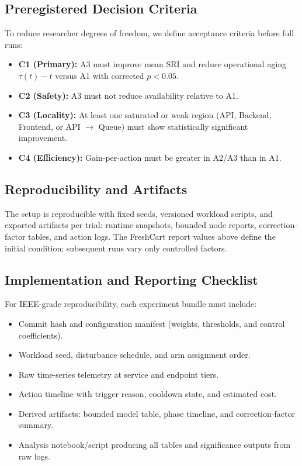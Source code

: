 \documentclass[conference]{IEEEtran}
\begin{document}
\subsection{Preregistered Decision Criteria}
To reduce researcher degrees of freedom, we define acceptance criteria before full runs:
\begin{itemize}
\item \textbf{C1 (Primary):} A3 must improve mean SRI and reduce operational aging $\tau(t)-t$ versus A1 with corrected $p<0.05$.
\item \textbf{C2 (Safety):} A3 must not reduce availability relative to A1.
\item \textbf{C3 (Locality):} At least one saturated or weak region (API, Backend, Frontend, or API $\rightarrow$ Queue) must show statistically significant improvement.
\item \textbf{C4 (Efficiency):} Gain-per-action must be greater in A2/A3 than in A1.
\end{itemize}

\subsection{Reproducibility and Artifacts}
The setup is reproducible with fixed seeds, versioned workload scripts, and exported artifacts per trial: runtime snapshots, bounded node reports, correction-factor tables, and action logs. The FreshCart report values above define the initial condition; subsequent runs vary only controlled factors.

\subsection{Implementation and Reporting Checklist}
For IEEE-grade reproducibility, each experiment bundle must include:
\begin{itemize}
\item Commit hash and configuration manifest (weights, thresholds, and control coefficients).
\item Workload seed, disturbance schedule, and arm assignment order.
\item Raw time-series telemetry at service and endpoint tiers.
\item Action timeline with trigger reason, cooldown state, and estimated cost.
\item Derived artifacts: bounded model table, phase timeline, and correction-factor summary.
\item Analysis notebook/script producing all tables and significance outputs from raw logs.
\end{itemize}
\end{document}
